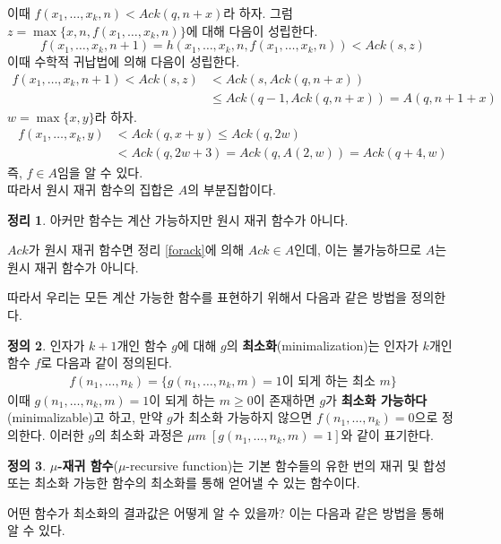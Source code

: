 \documentclass[b5paper, 11pt]{book}
\theoremstyle{definition}
\newtheorem{defn}{정의}[chapter]
\newtheorem{thm}[defn]{정리}
\newenvironment{pf*}{\pushQED{\qed}\pf}
{\popQED\endpf}
\begin{document}
\begin{pf*}
    이때 $f(x_1, \ldots,x_k, n) < Ack(q, n+x)$라 하자.  
    그럼 $z = \max\{x,n,f(x_1, \ldots, x_k, n)\}$에 대해 다음이
    성립한다.
    $$f(x_1, \ldots, x_k, n+1) = h(x_1, \ldots, x_k, n, f(x_1,\ldots, x_k ,n)) < Ack(s, z)$$
    이때 수학적 귀납법에 의해 다음이 성립한다.
    \begin{align*}
        f(x_1, \ldots, x_k, n+1) < Ack(s, z) &< Ack(s, Ack(q, n+x)) \\ 
       &\le Ack(q-1, Ack(q, n+x)) = A(q, n+1+x)
    \end{align*}
    $w = \max\{x,y\}$라 하자. 
    \begin{align*}
        f(x_1, \ldots, x_k, y) &< Ack(q, x+y) \le Ack(q, 2w) \\ 
        &< Ack(q, 2w+3) = Ack(q, A(2,w)) = Ack(q+4, w) 
    \end{align*}
    즉, $f \in A$임을 알 수 있다. \\ 
    따라서 원시 재귀 함수의 집합은 $A$의 부분집합이다. 
\end{pf*}
\begin{thm}
    아커만 함수는 계산 가능하지만 원시 재귀 함수가 아니다. 
\end{thm}
\begin{pf*}
    $Ack$가 원시 재귀 함수면 정리 \ref{forack}에 의해 $Ack \in A$인데, 
    이는 불가능하므로 $A$는 원시 재귀 함수가 아니다. 
\end{pf*}
따라서 우리는 모든 계산 가능한 함수를 표현하기 위해서 다음과 같은 방법을 정의한다.
\begin{defn} \label{minimalization}
    인자가 $k+1$개인 함수 $g$에 대해 $g$의 \textbf{최소화}(minimalization)는 인자가 $k$개인 함수 $f$로 다음과 같이 정의된다.
    \begin{align*}
        f(n_1, \ldots, n_k) = \{g(n_1, \ldots, n_k, m) = 1\text{이 되게 하는 최소 } m\}
    \end{align*}
    이때 $g(n_1, \ldots, n_k, m) = 1$이 되게 하는 $m \ge 0$이 존재하면 $g$가 \textbf{최소화 가능하다}(minimalizable)고 하고, 만약 $g$가 최소화 가능하지 않으면 $f(n_1, \ldots, n_k)=0$으로 정의한다. 이러한 $g$의 최소화 과정은 $\mu m \; [g(n_1, \ldots, n_k, m) = 1]$와 같이 표기한다. 
\end{defn}
\begin{defn}
    \textbf{$\mu$-재귀 함수}($\mu$-recursive function)는 기본 
    함수들의 유한 번의 재귀 및 합성 또는 최소화 가능한
    함수의 최소화를 통해 얻어낼 수 있는 함수이다. 
\end{defn}
어떤 함수가 최소화의 결과값은 어떻게 알 수 있을까? 이는 다음과 같은 방법을 통해 알 수 있다.
\end{document}
